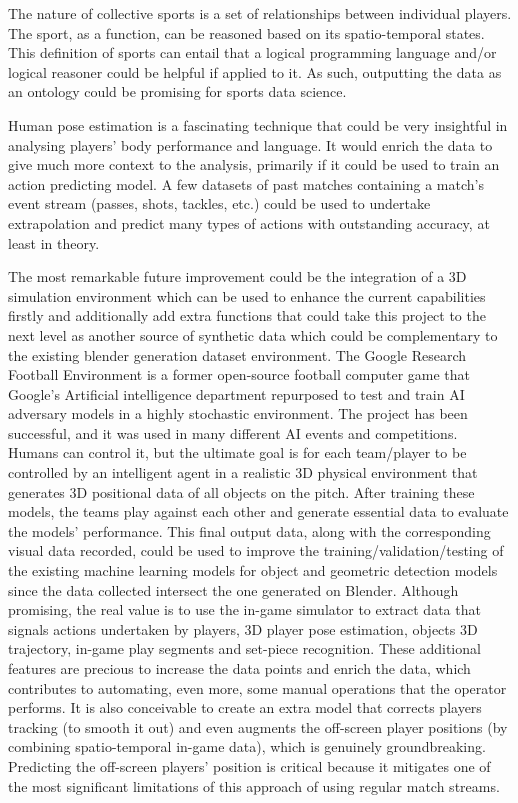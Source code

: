 \documentclass[
    11pt,
    oneside
]{report}
\begin{document}
The nature of collective sports is a set of relationships between individual players. The sport, as a function, can be reasoned based on its spatio-temporal states. This definition of sports can entail that a logical programming language and/or logical reasoner could be helpful if applied to it. As such, outputting the data as an ontology could be promising for sports data science.


Human pose estimation is a fascinating technique that could be very insightful in analysing players' body performance and language. It would enrich the data to give much more context to the analysis, primarily if it could be used to train an action predicting model. A few datasets of past matches containing a match's event stream (passes, shots, tackles, etc.) could be used to undertake extrapolation and predict many types of actions with outstanding accuracy, at least in theory.


The most remarkable future improvement could be the integration of a 3D simulation environment which can be used to enhance the current capabilities firstly and additionally add extra functions that could take this project to the next level as another source of synthetic data which could be complementary to the existing blender generation dataset environment. The Google Research Football Environment \cite{gfootball_env} is a former open-source football computer game that Google's Artificial intelligence department repurposed to test and train AI adversary models in a highly stochastic environment. The project has been successful, and it was used in many different AI events and competitions. Humans can control it, but the ultimate goal is for each team/player to be controlled by an intelligent agent in a realistic 3D physical environment that generates 3D positional data of all objects on the pitch. After training these models, the teams play against each other and generate essential data to evaluate the models' performance. This final output data, along with the corresponding visual data recorded, could be used to improve the training/validation/testing of the existing machine learning models for object and geometric detection models since the data collected intersect the one generated on Blender. Although promising, the real value is to use the in-game simulator to extract data that signals actions undertaken by players, 3D player pose estimation, objects 3D trajectory, in-game play segments and set-piece recognition. These additional features are precious to increase the data points and enrich the data, which contributes to automating, even more, some manual operations that the operator performs. It is also conceivable to create an extra model that corrects players tracking (to smooth it out) and even augments the off-screen player positions (by combining spatio-temporal in-game data), which is genuinely groundbreaking. Predicting the off-screen players' position is critical because it mitigates one of the most significant limitations of this approach of using regular match streams.
\end{document}
